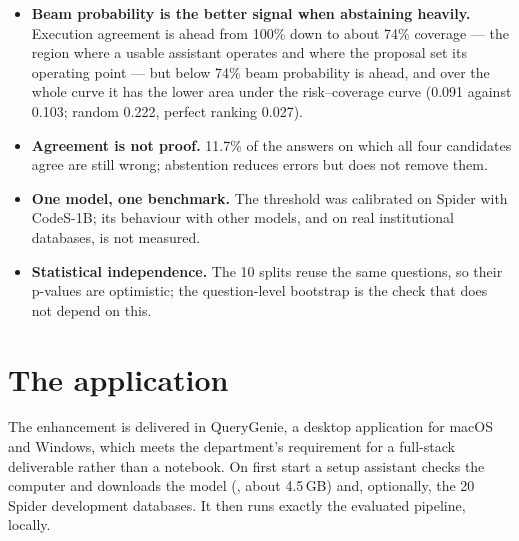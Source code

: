 \begin{itemize}
	\item \textbf{Beam probability is the better signal when abstaining heavily.} Execution agreement is ahead from 100\% down to about 74\% coverage --- the region where a usable assistant operates and where the proposal set its operating point --- but below 74\% beam probability is ahead, and over the whole curve it has the lower area under the risk--coverage curve (0.091 against 0.103; random 0.222, perfect ranking 0.027).
	\item \textbf{Agreement is not proof.} 11.7\% of the answers on which all four candidates agree are still wrong; abstention reduces errors but does not remove them.
	\item \textbf{One model, one benchmark.} The threshold was calibrated on Spider with CodeS-1B; its behaviour with other models, and on real institutional databases, is not measured.
	\item \textbf{Statistical independence.} The 10 splits reuse the same questions, so their p-values are optimistic; the question-level bootstrap is the check that does not depend on this.
\end{itemize}

\section{The application}

The enhancement is delivered in QueryGenie, a desktop application for macOS and Windows, which meets the department's requirement for a full-stack deliverable rather than a notebook. On first start a setup assistant checks the computer and downloads the model (, about 4.5\,GB) and, optionally, the 20 Spider development databases. It then runs exactly the evaluated pipeline, locally.

